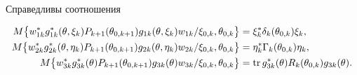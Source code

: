 \begin{lemnonum} Справедливы соотношения


\begin{align}


M\bigl\{w_{1k}^{*}g_{1k}^{*}(\theta,\xi_{k})P_{k+1}(\theta_{0,k+1})


g_{1k}(\theta,\xi_{k})w_{1k}/\xi_{0,k},\theta_{0,k}\bigr\}&= 


\xi_{k}^{*}\delta_{k}(\theta_{0,k})\xi_{k},\\


M\bigl\{w_{2k}^{*}g_{2k}^{*}(\theta,\eta_{k})P_{k+1}(\theta_{0,k+1})


g_{2k}(\theta,\eta_{k})w_{2k}/\xi_{0,k},\theta_{0,k}\bigr\}&= 


\eta_{k}^{*}\Gamma_{k}(\theta_{0,k})\eta_{k},\\


M\bigl\{w_{3k}^{*}g_{3k}^{*}(\theta)P_{k+1}(\theta_{0,k+1})


g_{3k}(\theta)w_{3k}/\xi_{0,k},\theta_{0,k}\bigr\}&= 


\tr g_{3k}^{*}(\theta)R_{k}(\theta_{0,k})g_{3k}(\theta).


\end{align}


\end{lemnonum}






